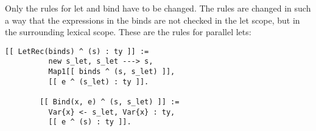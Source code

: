 \documentclass[answers]{exam}
\begin{document}
\begin{questions}
\begin{parts}
    \begin{solution}
      Only the rules for let and bind have to be changed. The rules
      are changed in such a way that the expressions in the binds are
      not checked in the let scope, but in the surrounding lexical
      scope. These are the rules for parallel lets:
      \begin{lstlisting}[language=NaBL2,gobble=8]
        [[ LetRec(binds) ^ (s) : ty ]] :=
          new s_let, s_let ---> s,
          Map1[[ binds ^ (s, s_let) ]],
          [[ e ^ (s_let) : ty ]].

        [[ Bind(x, e) ^ (s, s_let) ]] :=
          Var{x} <- s_let, Var{x} : ty,
          [[ e ^ (s) : ty ]].
      \end{lstlisting}
    \end{solution}
  \end{parts}
  
\end{questions}
\end{document}
